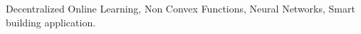 \documentclass[conference]{IEEEtran}
\begin{document}
\begin{IEEEkeywords}
Decentralized Online Learning, Non Convex Functions, Neural Networks,  Smart building application.
\end{IEEEkeywords}













\onecolumn 


% 
\end{document}
